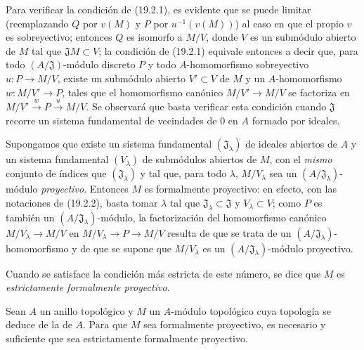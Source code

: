 \begin{env}[19.2.2]
\label{0.19.2.2-fr}
Para verificar la condición de (19.2.1), es evidente que se puede limitar
(reemplazando $Q$ por $v(M)$ y $P$ por $u^{-1}(v(M))$) al caso en que el propio
$v$ es sobreyectivo; entonces $Q$ es isomorfo a $M/V$, donde $V$ es un
submódulo abierto de $M$ tal que $\mathfrak JM\subset V$; la condición de
(19.2.1) equivale entonces a decir que, para todo $(A/\mathfrak J)$-módulo discreto
$P$ y todo $A$-homomorfismo sobreyectivo $u:P\to M/V$, existe un submódulo
abierto $V'\subset V$ de $M$ y un $A$-homomorfismo $w:M/V'\to P$, tales que
el homomorfismo canónico $M/V'\to M/V$ se factoriza en
$M/V'\xrightarrow{w}P\xrightarrow{u}M/V$.
Se observará que basta verificar esta condición cuando $\mathfrak J$
recorre un sistema fundamental de vecindades de 0 en $A$ formado por ideales.
\end{env}

\begin{env}[19.2.3]
\label{0.19.2.3-fr}
Supongamos que existe un sistema fundamental $(\mathfrak J_\lambda)$ de ideales
abiertos de $A$ y un sistema fundamental $(V_\lambda)$ de submódulos
abiertos de $M$, con el \emph{mismo} conjunto de índices que
$(\mathfrak J_\lambda)$ y tal que, para todo $\lambda$, $M/V_\lambda$ sea un
$(A/\mathfrak J_\lambda)$-módulo \emph{proyectivo}. Entonces $M$ es formalmente
proyectivo: en efecto, con las notaciones de (19.2.2), basta tomar
$\lambda$ tal que $\mathfrak J_\lambda\subset\mathfrak J$ y
$V_\lambda\subset V$; como $P$ es también un
$(A/\mathfrak J_\lambda)$-módulo, la factorización del homomorfismo canónico
$M/V_\lambda\to M/V$ en $M/V_\lambda\to P\to M/V$ resulta de que se trata
de un $(A/\mathfrak J_\lambda)$-homomorfismo y de que se supone que
$M/V_\lambda$ es un $(A/\mathfrak J_\lambda)$-módulo proyectivo.

Cuando se satisface la condición más estricta de este número, se dice que $M$
es \emph{estrictamente formalmente proyectivo}.
\end{env}

\begin{proposition}[19.2.4]
\label{0.19.2.4-fr}
Sean $A$ un anillo topológico y $M$ un $A$-módulo topológico cuya
topología se deduce de la de $A$. Para que $M$ sea formalmente
proyectivo, es necesario y suficiente que sea estrictamente formalmente proyectivo.
\end{proposition}


